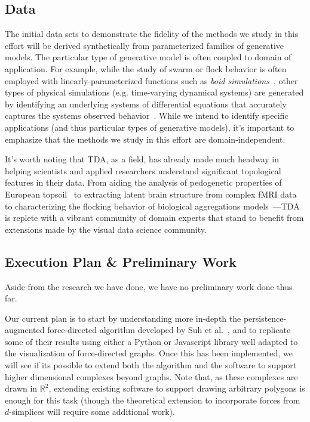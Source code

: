 \documentclass{vgtc}                          %
\begin{document}
\subsection{Data}
The initial data sets to demonstrate the fidelity of the methods we study in this effort will be derived synthetically from parameterized families of generative models. The particular type of generative model is often coupled to domain of application. For example, while the study of swarm or flock behavior is often employed with linearly-parameterized functions such as \emph{boid simulations}~\cite{reynolds1987flocks}, other types of physical simulations (e.g. time-varying dynamical systems) are generated by identifying an underlying systems of differential equations that accurately captures the systems observed behavior~\cite{kim2021spatiotemporal}. While we intend to identify specific applications (and thus particular types of generative models), it's important to emphasize that the methods we study in this effort are domain-independent. 

It's worth noting that TDA, as a field, has already made much headway in helping scientists and applied researchers understand significant topological features in their data. From aiding the analysis of pedogenetic properties of European topsoil~\cite{savic2017topological} to extracting latent brain structure from complex fMRI data~\cite{salch2021mathematics} to characterizing the flocking behavior of biological aggregations models~\cite{topaz2015topological}---TDA is replete with a vibrant community of domain experts that stand to benefit from extensions made by the visual data science community. 


\subsection{Execution Plan \& Preliminary Work}
Aside from the research we have done, we have no preliminary work done thus far. 

Our current plan is to start by understanding more in-depth the persistence-augmented force-directed algorithm developed by Suh et al.~\cite{suh2019persistent}, and to replicate some of their results using either a Python or Javascript library well adapted to the visualization of force-directed graphs. Once this has been implemented, we will see if its possible to extend both the algorithm and the software to support higher dimensional complexes beyond graphs. Note that, as these complexes are drawn in $\mathbb{R}^2$, extending existing software to support drawing arbitrary polygons is enough for this task (though the theoretical extension to incorporate forces from $d$-simplices will require some additional work). 
\end{document}
